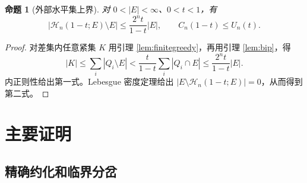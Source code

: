 \documentclass[UTF8,11pt,fontset=none]{ctexart}
\newtheorem{proposition}[theorem]{命题}
\theoremstyle{remark}
\newcommand{\Hc}{\mathcal H_n}
\newcommand{\Cn}{C_n}
\begin{document}
\begin{proposition}[外部水平集上界]\label{prop:upper}
对 \(0<|E|<\infty\)、\(0<t<1\)，有
\begin{equation}\label{eq:external}
 |\Hc(1-t;E)\setminus E|\le\frac{2^nt}{1-t}|E|,
 \qquad \Cn(1-t)\le U_n(t).
\end{equation}
\end{proposition}
\begin{proof}
对差集内任意紧集 \(K\) 用引理 \ref{lem:finitegreedy}，再用引理 \ref{lem:bip}，得
\[
 |K|\le\sum_i|Q_i\setminus E|
 <\frac{t}{1-t}\sum_i|Q_i\cap E|
 \le\frac{2^nt}{1-t}|E|.
\]
内正则性给出第一式。Lebesgue 密度定理给出
\(|E\setminus\Hc(1-t;E)|=0\)，从而得到第二式。
\end{proof}


\section{主要证明}

\subsection{精确约化和临界分岔}
\end{document}
